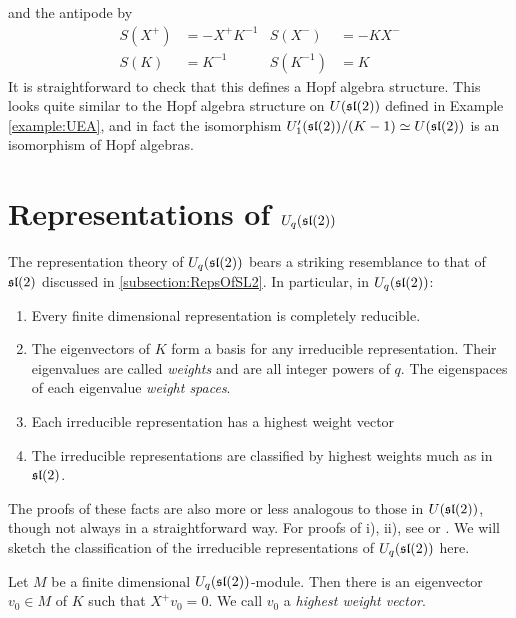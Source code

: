 and the antipode by
\begin{align}
    S(X^+) &= - X^+ K^{-1} & S(X^-)      &= -KX^- \\
    S(K) &= K^{-1}   & S(K^{-1}) &= K 
\end{align}
It is straightforward to check that this defines a Hopf algebra structure. This
looks quite similar to the Hopf algebra structure on $U(\mathfrak{sl}(2))$ defined in
Example \ref{example:UEA}, and in fact the isomorphism $U_1'(\mathfrak{sl}(2)) /(K-1)
\simeq U(\mathfrak{sl}(2))$ is an isomorphism of Hopf algebras.

\section{Representations of $U_q(\mathfrak{sl}(2))$}
\label{section:RepsOfUq}

The representation theory of $U_q(\mathfrak{sl}(2))$ bears a striking resemblance to
that of $\mathfrak{sl}(2)$ discussed in \ref{subsection:RepsOfSL2}. In particular, in
$U_q(\mathfrak{sl}(2))$:


\begin{enumerate}
    \renewcommand{\labelenumi}{\roman{enumi})}
    \item Every finite dimensional representation is completely reducible.
    \item The eigenvectors of $K$ form a basis for any irreducible
          representation. Their eigenvalues are called \emph{weights} and are
          all integer powers of $q$.  The eigenspaces of each eigenvalue
          \emph{weight spaces}.  
    \item Each irreducible representation has a highest weight vector
    \item The irreducible representations are classified by highest weights
    much as in $\mathfrak{sl}(2)$.
\end{enumerate}

The proofs of these facts are also more or less analogous to those in
$U(\mathfrak{sl}(2))$, though not always in a straightforward way. For proofs of i),
ii), see \cite{Kassel1994} or \cite{Jantzen1995}. We will sketch the
classification of the irreducible representations of $U_q(\mathfrak{sl}(2))$ here.

\begin{claim}
\label{claim:HighestWeight}
    Let $M$ be a finite dimensional $U_q(\mathfrak{sl}(2))$-module. Then there is an
    eigenvector $v_0 \in M$ of $K$ such that $ X^+ v_0 = 0$. We call $v_0$ a
    \emph{highest weight vector}.
\end{claim}

